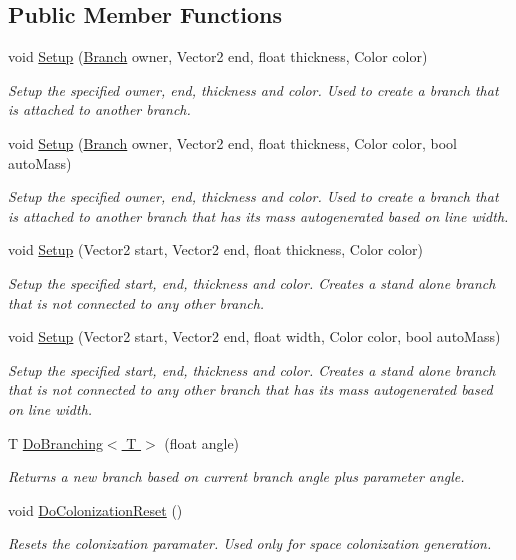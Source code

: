 \subsection*{Public Member Functions}
\begin{DoxyCompactItemize}
\item 
void \hyperlink{interface_fractal_tree_1_1_branch_a1bad78362d67435aed4538b207f4155b}{Setup} (\hyperlink{interface_fractal_tree_1_1_branch}{Branch} owner, Vector2 end, float thickness, Color color)
\begin{DoxyCompactList}\small\item\em Setup the specified owner, end, thickness and color. Used to create a branch that is attached to another branch. \end{DoxyCompactList}\item 
void \hyperlink{interface_fractal_tree_1_1_branch_aac4a29be86256dff265190ed0d3ef250}{Setup} (\hyperlink{interface_fractal_tree_1_1_branch}{Branch} owner, Vector2 end, float thickness, Color color, bool auto\+Mass)
\begin{DoxyCompactList}\small\item\em Setup the specified owner, end, thickness and color. Used to create a branch that is attached to another branch that has its mass autogenerated based on line width. \end{DoxyCompactList}\item 
void \hyperlink{interface_fractal_tree_1_1_branch_a6c313c988c603a9d558871bd560a0b70}{Setup} (Vector2 start, Vector2 end, float thickness, Color color)
\begin{DoxyCompactList}\small\item\em Setup the specified start, end, thickness and color. Creates a stand alone branch that is not connected to any other branch. \end{DoxyCompactList}\item 
void \hyperlink{interface_fractal_tree_1_1_branch_ad813c22ae887cf465056d5eee5acb651}{Setup} (Vector2 start, Vector2 end, float width, Color color, bool auto\+Mass)
\begin{DoxyCompactList}\small\item\em Setup the specified start, end, thickness and color. Creates a stand alone branch that is not connected to any other branch that has its mass autogenerated based on line width. \end{DoxyCompactList}\item 
T \hyperlink{interface_fractal_tree_1_1_branch_ad3240d5e5d13df2ee22e55892f9c03cd}{Do\+Branching$<$ T $>$} (float angle)
\begin{DoxyCompactList}\small\item\em Returns a new branch based on current branch angle plus parameter angle. \end{DoxyCompactList}\item 
void \hyperlink{interface_fractal_tree_1_1_branch_a4460379e72ec587f890b1e0cf77dbc3c}{Do\+Colonization\+Reset} ()
\begin{DoxyCompactList}\small\item\em Resets the colonization paramater. Used only for space colonization generation. \end{DoxyCompactList}\end{DoxyCompactItemize}
